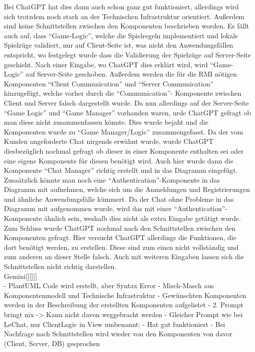 Bei ChatGPT hat dies dann auch schon ganz gut funktioniert, allerdings wird sich trotzdem noch stark an der Technischen Infrastruktur orientiert.
Außerdem sind keine Schnittstellen zwischen den Komponenten beschrieben worden. Es fällt auch auf, dass ``Game-Logic'', welche die Spielregeln implementiert
und lokale Spielzüge validiert, nur auf Client-Seite ist, was nicht den Anwendungsfällen entspricht, wo festgelegt wurde dass die Validierung der 
Spielzüge auf Server-Seite geschieht. Nach einer Eingabe, wo ChatGPT dies erklärt wird, wird ``Game-Logic'' auf Server-Seite geschoben. Außerdem werden 
die für die RMI nötigen Komponenten ``Client Communication'' und ``Server Communication'' hinzugefügt, welche vorher durch die ``Communication''- Komponente 
zwischen Client und Server falsch dargestellt wurde. Da nun allerdings auf der Server-Seite ``Game Logic'' und ``Game Manager'' vorhanden waren, 
urde ChatGPT gefragt ob man diese nicht zusammenfassen könnte. Dies wurde bejaht und die Komponenten wurde zu ``Game Manager/Logic'' 
zusammengefasst. Da der vom Kunden angeforderte Chat nirgends erwähnt wurde, wurde ChatGPT diesbezüglich nochmal gefragt ob dieser in einer Komponente 
enthalten sei oder eine eigene Komponente für diesen benötigt wird. Auch hier wurde dann die Komponente ``Chat Manager'' richtig erstellt und in das Diagramm 
eingefügt. Zusaätzlich könnte man noch eine ``Authentication''-Komponente in das Diagramm mit aufnehmen, welche sich um die Anmeldungen und 
Registrierungen und ähnliche Anwendungsfälle kümmert. Da der Chat ohne Probleme in das Diagramm mit aufgenommen wurde, wird das mit einer 
``Authentication''-Komponente ähnlich sein, weshalb dies nicht als extra Eingabe getätigt wurde. Zum Schluss wurde ChatGPT nochmal nach den Schnittstellen 
zwischen den Komponenten gefragt. Hier versucht ChatGPT allerdings die Funktionen, die dort benötigt werden, zu erstellen. Diese sind zum einen nicht 
vollständig und zum anderen an dieser Stelle falsch. Auch mit weiteren Eingaben lassen sich die Schnittstellen nicht richtig darstellen.\\

Gemini[[[]]]\\
    - PlantUML Code wird erstellt, aber Syntax Error
    - Misch-Masch aus Komponentenmodell und Technische Infrastruktur
    - Gewünschten Komponenten werden in der Beschreibung der erstellten Komponenten aufgelistet
    - 2. Prompt bringt nix
    -> Kann nicht davon weggebracht werden
    - Gleicher Prompt wie bei LeChat, nur ClientLogic in View umbenannt:
        - Hat gut funktioniert
        - Bei Nachfrage nach Schnittstellen wird wieder von den Komponenten von davor (Client, Server, DB) gesprochen


